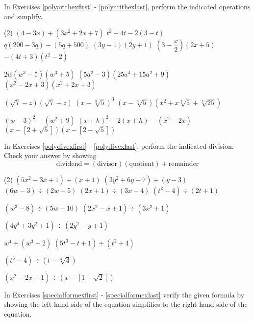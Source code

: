 \label{ExercisesforAppPolyArith}

In Exercises \ref{polyarithexfirst} - \ref{polyarithexlast}, perform the indicated operations and simplify.

\begin{tasks}(2)
\task  $(4-3x) + (3x^2 + 2x + 7)$ \label{polyarithexfirst}
\task $t^2 + 4t - 2(3-t)$
\task $q(200-3q) - (5q + 500)$
\task $(3y-1)(2y+1)$
\task $\left(3-\dfrac{x}{2}\right)(2x+5)$
\task $-(4t+3)(t^2-2)$

\task $2w(w^3-5)(w^3+5)$
\task $(5a^2 - 3)(25a^4 + 15a^2 + 9)$
\task $(x^2-2x+3)(x^2+2x+3)$

\task $(\sqrt{7} - z)(\sqrt{7} + z)$
\task $(x - \sqrt[3]{5})^3$
\task $(x - \sqrt[3]{5})(x^2 + x\sqrt[3]{5} + \sqrt[3]{25})$

\task $(w-3)^2 - (w^2 + 9)$
\task $(x+h)^2 - 2(x+h) - (x^2 - 2x)$
\task $(x-[2+\sqrt{5}])(x-[2-\sqrt{5}])$ \label{polyarithexlast}

\end{tasks}

In Exercises \ref{polydivexfirst} - \ref{polydivexlast}, perform the indicated division.  Check your answer by showing \[\text{dividend} = (\text{divisor})( \text{quotient}) + \text{remainder}\]

\begin{tasks}[resume](2)
\task $(5x^2 - 3x + 1) \div (x + 1)$ \label{polydivexfirst}
\task $(3y^2 + 6y - 7) \div (y-3)$
\task $(6w - 3) \div (2w+5)$
\task $(2x+1) \div (3x-4)$
\task $(t^2 - 4) \div (2t + 1)$

\task $(w^3 - 8) \div (5w-10)$
\task $(2x^2 - x + 1) \div (3x^2 + 1)$

\task $(4y^4+3y^2+1) \div (2y^2-y+1)$

\task $w^4 \div (w^3 - 2)$
\task $(5t^3 - t + 1) \div (t^2 + 4)$

\task $(t^3 - 4) \div (t - \sqrt[3]{4})$

\task $(x^2-2x-1) \div (x-[1-\sqrt{2}])$  \label{polydivexlast}

\end{tasks}

In Exercises \ref{specialformexfirst} - \ref{specialformexlast} verify the given formula by showing the left hand side of the equation simplifies to the right hand side of the equation.

